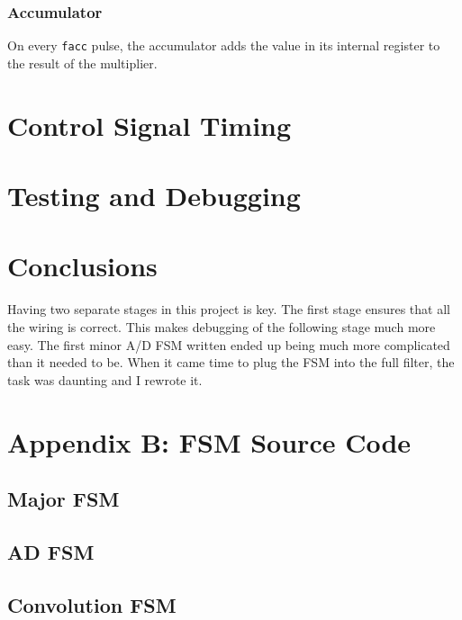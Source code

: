 \documentclass[12pt]{article}
\begin{document}
		\subsubsection{Accumulator}
		On every \texttt{facc} pulse, the accumulator adds the value in its internal
		register to the result of the multiplier.
	
\section{Control Signal Timing}

\section{Testing and Debugging}


\section{Conclusions}
	Having two separate stages in this project is key.  The first stage ensures
	that all the wiring is correct.  This makes debugging of the following
	stage much more easy.  The first minor A/D FSM written ended up being much
	more complicated than it needed to be.  When it came time to plug the FSM
	into the full filter, the task was daunting and I rewrote it.


\newpage
\section{Appendix B: FSM Source Code}
	\subsection{Major FSM}
	\begin{lgrind}
	
	\end{lgrind}

	\subsection{AD FSM}
	\begin{lgrind}
	
	\end{lgrind}

	\subsection{Convolution FSM}
	\begin{lgrind}
	
	\end{lgrind}
\end{document}

